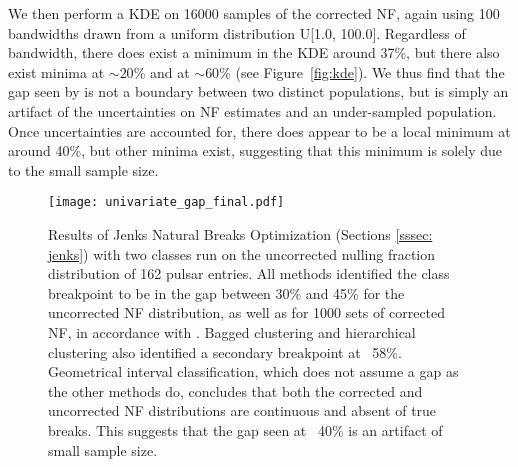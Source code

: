 \documentclass[fleqn,usenatbib]{mnras}
\begin{document}

We then perform a KDE on 16000 samples of the corrected NF, again using 100 bandwidths drawn from a uniform distribution U[1.0, 100.0]. Regardless of bandwidth, there does exist a minimum in the KDE around 37\%, but there also exist minima at $\sim20$\% and at $\sim60$\% (see Figure~\ref{fig:kde}).
We thus find that the gap seen by \citet{Konar2019} is not a boundary between two distinct populations, but is simply an artifact of the uncertainties on NF estimates and an under-sampled population. Once uncertainties are accounted for, there does appear to be a local minimum at around 40\%, but other minima exist, suggesting that this minimum is solely due to the small sample size.

\begin{figure} 
    \centering
    \texttt{[image: univariate\_gap\_final.pdf]}
    \caption{Results of Jenks Natural Breaks Optimization (Sections \ref{sssec: jenks}) with two classes run on the uncorrected nulling fraction distribution of 162 pulsar entries. All methods identified the class breakpoint to be in the gap between 30\% and 45\% for the uncorrected NF distribution, as well as for 1000 sets of corrected NF, in accordance with \citet{Konar2019}. Bagged clustering and hierarchical clustering also identified a secondary breakpoint at ~58\%. Geometrical interval classification, which does not assume a gap as the other methods do, concludes that both the corrected and uncorrected NF distributions are continuous and absent of true breaks. This suggests that the gap seen at ~40\% is an artifact of small sample size.}
    \label{fig:univariate_gap_final}
\end{figure}
\end{document}
